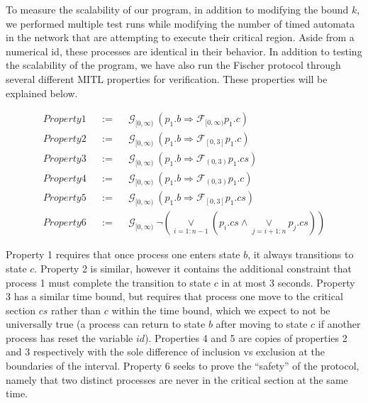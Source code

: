 \documentclass[a4paper,12pt]{article}
\begin{document}
To measure the scalability of our program, in addition to modifying the bound
\(k\), we performed multiple test runs while modifying the number of timed
automata in the network that are attempting to execute their critical region.
Aside from a numerical id, these processes are identical in their behavior.
In addition to testing the scalability of the program, we have also run the
Fischer protocol through several different MITL properties for verification.
These properties will be explained below.

\begin{align}
&Property 1 &&:=&& \mathcal{G}_{[0,\infty)}\ (p_1.b \Rightarrow \mathcal{F}_{[0,\infty)}p_1.c) &\nonumber \\
&Property 2 &&:=&& \mathcal{G}_{[0,\infty)}\ (p_1.b \Rightarrow \mathcal{F}_{[0,3]}p_1.c) &\nonumber \\
&Property 3 &&:=&& \mathcal{G}_{[0,\infty)}\ (p_1.b \Rightarrow \mathcal{F}_{(0,3)}p_1.cs) &\nonumber \\
&Property 4 &&:=&& \mathcal{G}_{[0,\infty)}\ (p_1.b \Rightarrow \mathcal{F}_{(0,3)}p_1.c) &\nonumber \\
&Property 5 &&:=&& \mathcal{G}_{[0,\infty)}\ (p_1.b \Rightarrow \mathcal{F}_{[0,3]}p_1.cs) &\nonumber \\
&Property 6 &&:=&& \mathcal{G}_{[0,\infty)}\ \neg (\underset{i=1:n-1}{\lor} (p_i.cs \land \underset{j=i+1:n}{\lor} p_j.cs ))  &\nonumber
\end{align}

Property 1 requires that once process one enters state \(b\), it always
transitions to state \(c\). Property 2 is similar, however it contains the
additional constraint that process 1 must complete the transition to state \(c\)
in at most 3 seconds. Property 3 has a similar time bound, but requires that
process one move to the critical section \(cs\) rather than \(c\) within the
time bound, which we expect to not be universally true (a process can return to
state \(b\) after moving to state \(c\) if another process has reset the
variable \(id\)). Properties 4 and 5 are copies of properties 2 and 3
respectively with the sole difference of inclusion vs exclusion at the
boundaries of the interval. Property 6 seeks to prove the ``safety'' of the
protocol, namely that two distinct processes are never in the critical section
at the same time.
\end{document}
